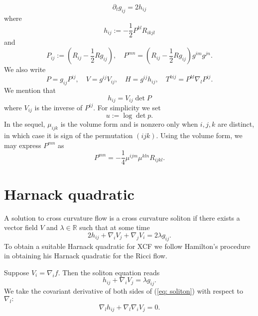 \documentclass{amsart}
\theoremstyle{definition}
\theoremstyle{remark}
\numberwithin{equation}{section}
\begin{document}
\begin{equation}
\partial_tg_{ij}=2h_{ij}
\end{equation}
where
\begin{equation}
h_{ij}:=-\frac{1}{2}P^{kl}R_{ikjl}
\end{equation}
and
\begin{equation}
P_{ij}:=(R_{ij}-\frac{1}{2}Rg_{ij}),\quad
P^{mn}=(R_{ij}-\frac{1}{2}Rg_{ij})g^{im}g^{jn}.
\end{equation}
We also write
\begin{equation}
P=g_{ij}P^{ij},\quad V=g^{ij}V_{ij},\quad H=g^{ij}h_{ij},\quad  T^{kij}=P^{kl}\nabla_l P^{ij}.
\end{equation}
We mention that
\begin{equation}
h_{ij}=V_{ij}\det P
\end{equation}
where $V_{ij}$ is the inverse of $P^{ij}.$
For simplicity we set
\[u:=\log\det p.\]
In the sequel, $\mu_{ijk}$ is the volume form and is nonzero only when $i,j,k$ are distinct, in which case it is sign of the permutation $(ijk)$. Using the volume form, we may express $P^{mn}$ as
\begin{equation}
P^{mn}=-\frac{1}{4}\mu^{ijm}\mu^{kln}R_{ijkl}.
\end{equation}
\section{Harnack quadratic}
A solution to cross curvature flow is a cross curvature soliton if there exists a vector field $V$ and $\lambda\in \mathbb{R}$ such that at some time
\begin{equation}
2h_{ij}+\nabla_iV_j+\nabla_jV_i=2\lambda g_{ij}.
\end{equation}
To obtain a suitable Harnack quadratic for XCF we follow Hamilton's procedure in obtaining his Harnack quadratic for the Ricci flow.

Suppose $V_i=\nabla_if.$ Then the soliton equation reads
\begin{equation}\label{eq: soliton}
h_{ij}+\nabla_iV_j=\lambda g_{ij}.
\end{equation}
We take the covariant derivative of both sides of (\ref{eq: soliton}) with respect to $\nabla_l:$
\begin{align}\label{eq: soliton derv}
\nabla_lh_{ij}+\nabla_l\nabla_iV_j=0.
\end{align}
\end{document}
